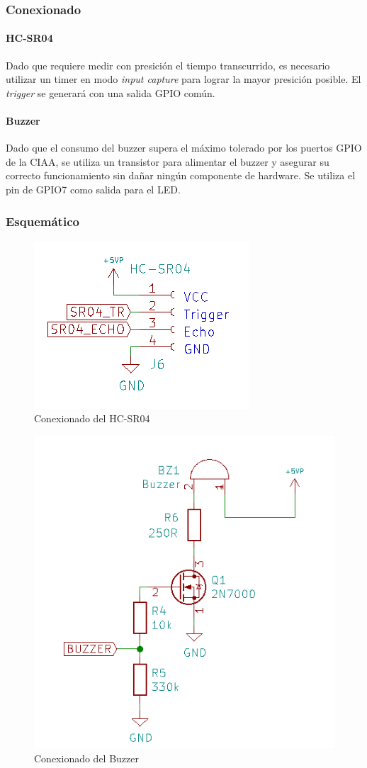\subsubsection{Conexionado}

\paragraph{HC-SR04} Dado que requiere medir con presición el tiempo transcurrido, es
necesario utilizar un timer en modo \emph{input capture} para lograr la
mayor presición posible. El \emph{trigger} se generará con una salida
GPIO común.

\paragraph{Buzzer}Dado que el consumo del buzzer supera el máximo tolerado por los puertos GPIO de la CIAA, 
se utiliza un transistor para alimentar el buzzer y asegurar su correcto funcionamiento
sin dañar ningún componente de hardware. Se utiliza el pin de GPIO7 como salida para el LED.

\subsubsection{Esquemático}

\begin{figure}[H]
	\centering
	\includegraphics[width=0.4\linewidth]{informe_3/schem_hcsr04}
	\caption{Conexionado del HC-SR04}
	\label{fig:schemhcsr04}
\end{figure}

\begin{figure}[H]
	\centering
	\includegraphics[width=0.5\linewidth]{informe_3/schem_buzzer}
	\caption{Conexionado del Buzzer}
	\label{fig:schembuzzer}
\end{figure}

